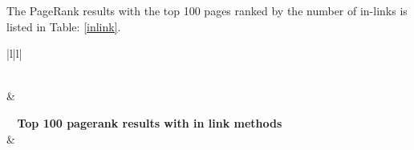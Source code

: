 \documentclass[a4paper]{article}
\begin{document}
The PageRank results with the top 100 pages ranked by the number of in-links is listed in Table: \ref{inlink}.

\begin{center}
\begin{longtable}{|l|l|}
\caption{Top 100 pagerank results with in link methods} \label{inlink} \\

\hline 
{} & 
\\ \hline 
\endfirsthead

%
{{\bfseries \tablename\ \thetable{} Top 100 pagerank results with in link methods}} \\
\hline 
{} & 
\\ \hline 
\endhead

\hline {} \\ \hline
\endfoot 


\end{longtable}
\end{center}
\end{document}
